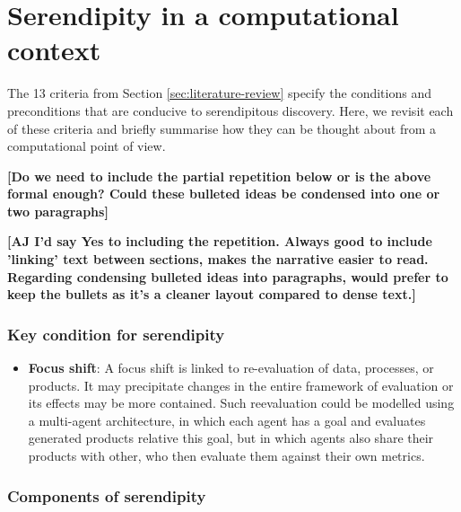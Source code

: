 \section{Serendipity in a computational context} \label{sec:computational-serendipity}

The 13 criteria from Section \ref{sec:literature-review}
specify the conditions and preconditions that are conducive to
serendipitous discovery.  Here, we revisit each of these criteria and
briefly summarise how they can be thought about from a computational
point of view.

\textbf{[Do we need to include the partial repetition below or is the
    above formal enough?  Could these bulleted ideas be condensed into
    one or two paragraphs]}

\textbf{[AJ I'd say Yes to including the repetition. Always good to include ’linking’ text between sections, makes the narrative easier to read. Regarding condensing bulleted ideas into paragraphs, would prefer to keep the bullets as it's a cleaner layout compared to dense text.]}

\subsubsection*{Key condition for serendipity}

\begin{itemize}
\item \textbf{Focus shift}: A focus shift is linked to re-evaluation
  of data, processes, or products.  It may precipitate changes in the
  entire framework of evaluation or its effects may be more contained.
  Such reevaluation could be modelled using a multi-agent
  architecture, in which each agent has a goal and evaluates generated
  products relative this goal, but in which agents also share their
  products with other, who then evaluate them against their own
  metrics.
\end{itemize}

\subsubsection*{Components of serendipity}

